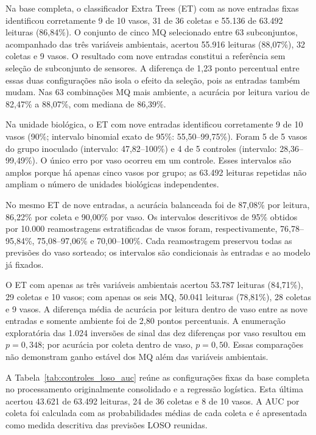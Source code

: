 Na base completa, o classificador Extra Trees (ET) com as nove entradas
fixas identificou corretamente 9 de 10 vasos, 31 de 36 coletas e
55.136 de 63.492 leituras (86,84\%). O conjunto
de cinco MQ selecionado entre 63 subconjuntos, acompanhado das três
variáveis ambientais, acertou 55.916 leituras (88,07\%), 32 coletas e
9 vasos. O resultado com nove entradas constitui a referência sem
seleção de subconjunto de sensores. A diferença de 1,23 ponto percentual
entre essas duas configurações não isola o efeito da seleção, pois as
entradas também mudam. Nas 63 combinações MQ mais ambiente, a acurácia
por leitura variou de 82,47\% a 88,07\%, com mediana de 86,39\%.

Na unidade biológica, o ET com nove entradas identificou corretamente
9 de 10 vasos (90\%; intervalo binomial exato de 95\%: 55,50--99,75\%).
Foram 5 de 5 vasos do grupo inoculado (intervalo: 47,82--100\%) e
4 de 5 controles (intervalo: 28,36--99,49\%). O único erro por vaso
ocorreu em um controle. Esses intervalos são amplos porque há apenas
cinco vasos por grupo; as 63.492 leituras repetidas não ampliam o número
de unidades biológicas independentes.

No mesmo ET de nove entradas, a acurácia balanceada foi de 87,08\% por
leitura, 86,22\% por coleta e 90,00\% por vaso. Os intervalos descritivos
de 95\% obtidos por 10.000 reamostragens estratificadas de vasos foram,
respectivamente, 76,78--95,84\%, 75,08--97,06\% e 70,00--100\%.
Cada reamostragem preservou todas as previsões do vaso sorteado; os
intervalos são condicionais às entradas e ao modelo já fixados.

O ET com apenas as três variáveis ambientais acertou 53.787 leituras
(84,71\%), 29 coletas e 10 vasos; com apenas os seis MQ, 50.041 leituras
(78,81\%), 28 coletas e 9 vasos. A diferença média de acurácia por
leitura dentro de vaso entre as nove entradas e somente ambiente foi de
2,80 pontos percentuais. A enumeração exploratória das 1.024 inversões
de sinal das dez diferenças por vaso resultou em $p=0{,}348$; por acurácia
por coleta dentro de vaso, $p=0{,}50$. Essas comparações não demonstram
ganho estável dos MQ além das variáveis ambientais.

A Tabela~\ref{tab:controles_loso_auc} reúne as configurações fixas da
base completa no processamento originalmente consolidado e a regressão
logística. Esta última acertou 43.621 de
63.492 leituras, 24 de 36 coletas e 8 de 10 vasos. A AUC por coleta foi
calculada com as probabilidades médias de cada coleta e é apresentada
como medida descritiva das previsões LOSO reunidas.

